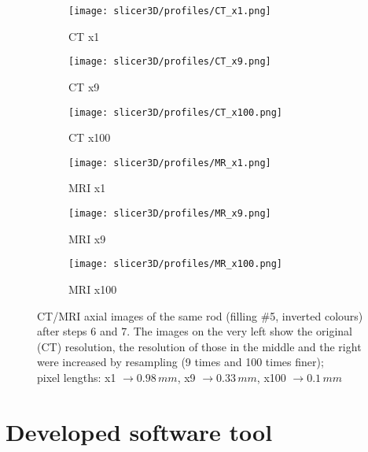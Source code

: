 \begin{figure}[!thb]
  \begin{subfigure}[b]{0.32\textwidth}
    \texttt{[image: slicer3D/profiles/CT\_x1.png]}
    \caption{CT x1}
    \label{fig:CT_x1}
  \end{subfigure}
  \hfill
  \begin{subfigure}[b]{0.32\textwidth}
    \texttt{[image: slicer3D/profiles/CT\_x9.png]}
    \caption{CT x9}
    \label{fig:CT_x9}
  \end{subfigure}
    \hfill
  \begin{subfigure}[b]{0.32\textwidth}
    \texttt{[image: slicer3D/profiles/CT\_x100.png]}
    \caption{CT x100}
    \label{fig:CT_x100}
  \end{subfigure}
  \begin{subfigure}[b]{0.32\textwidth}
    \texttt{[image: slicer3D/profiles/MR\_x1.png]}
    \caption{MRI x1}
    \label{fig:MRI_x1}
  \end{subfigure}
  \hfill
  \begin{subfigure}[b]{0.32\textwidth}
    \texttt{[image: slicer3D/profiles/MR\_x9.png]}
    \caption{MRI x9}
    \label{fig:MRI_x9}
  \end{subfigure}
    \hfill
  \begin{subfigure}[b]{0.32\textwidth}
    \texttt{[image: slicer3D/profiles/MR\_x100.png]}
    \caption{MRI x100}
    \label{fig:MRI_x100}
  \end{subfigure}
  \caption[Rendered image of phantom after steps 4 and 5 of pre-processing.]{CT/MRI axial images of the same rod (filling \#5, inverted colours) after steps 6 and 7. The images on the very left show the original (CT) resolution, the resolution of those in the middle and the right were increased by resampling (9 times and 100 times finer);\\ pixel lengths: x1 $\rightarrow 0.98\, mm$, x9 $\rightarrow0.33\, mm$, x100 $\rightarrow0.1\, mm$}
  \label{fig:resample}
\end{figure}
\clearpage

\section{Developed software tool}

